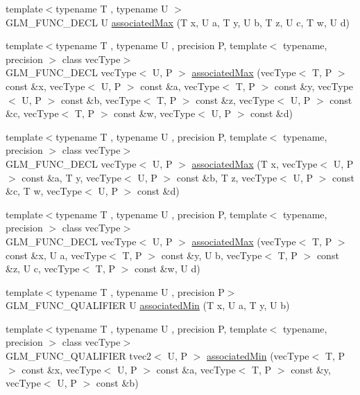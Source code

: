 \begin{DoxyCompactItemize}
\item 
{\footnotesize template$<$typename T , typename U $>$ }\\G\+L\+M\+\_\+\+F\+U\+N\+C\+\_\+\+D\+E\+C\+L U \hyperlink{group__gtx__associated__min__max_ga3038ffcb43eaa6af75897a99a5047ccc}{associated\+Max} (T x, U a, T y, U b, T z, U c, T w, U d)
\item 
{\footnotesize template$<$typename T , typename U , precision P, template$<$ typename, precision $>$ class vec\+Type$>$ }\\G\+L\+M\+\_\+\+F\+U\+N\+C\+\_\+\+D\+E\+C\+L vec\+Type$<$ U, P $>$ \hyperlink{group__gtx__associated__min__max_gaf607886421c35cd7e4f41a50d7c330e3}{associated\+Max} (vec\+Type$<$ T, P $>$ const \&x, vec\+Type$<$ U, P $>$ const \&a, vec\+Type$<$ T, P $>$ const \&y, vec\+Type$<$ U, P $>$ const \&b, vec\+Type$<$ T, P $>$ const \&z, vec\+Type$<$ U, P $>$ const \&c, vec\+Type$<$ T, P $>$ const \&w, vec\+Type$<$ U, P $>$ const \&d)
\item 
{\footnotesize template$<$typename T , typename U , precision P, template$<$ typename, precision $>$ class vec\+Type$>$ }\\G\+L\+M\+\_\+\+F\+U\+N\+C\+\_\+\+D\+E\+C\+L vec\+Type$<$ U, P $>$ \hyperlink{group__gtx__associated__min__max_ga7a165de1af9a3f9193516a3b47407086}{associated\+Max} (T x, vec\+Type$<$ U, P $>$ const \&a, T y, vec\+Type$<$ U, P $>$ const \&b, T z, vec\+Type$<$ U, P $>$ const \&c, T w, vec\+Type$<$ U, P $>$ const \&d)
\item 
{\footnotesize template$<$typename T , typename U , precision P, template$<$ typename, precision $>$ class vec\+Type$>$ }\\G\+L\+M\+\_\+\+F\+U\+N\+C\+\_\+\+D\+E\+C\+L vec\+Type$<$ U, P $>$ \hyperlink{group__gtx__associated__min__max_ga3122fbe8133ea54749b10fb93e8a167e}{associated\+Max} (vec\+Type$<$ T, P $>$ const \&x, U a, vec\+Type$<$ T, P $>$ const \&y, U b, vec\+Type$<$ T, P $>$ const \&z, U c, vec\+Type$<$ T, P $>$ const \&w, U d)
\item 
{\footnotesize template$<$typename T , typename U , precision P$>$ }\\G\+L\+M\+\_\+\+F\+U\+N\+C\+\_\+\+Q\+U\+A\+L\+I\+F\+I\+E\+R U \hyperlink{group__gtx__associated__min__max_gacc01bd272359572fc28437ae214a02df}{associated\+Min} (T x, U a, T y, U b)
\item 
{\footnotesize template$<$typename T , typename U , precision P, template$<$ typename, precision $>$ class vec\+Type$>$ }\\G\+L\+M\+\_\+\+F\+U\+N\+C\+\_\+\+Q\+U\+A\+L\+I\+F\+I\+E\+R tvec2$<$ U, P $>$ \hyperlink{group__gtx__associated__min__max_ga8b538d10872626668a078e2bd495af25}{associated\+Min} (vec\+Type$<$ T, P $>$ const \&x, vec\+Type$<$ U, P $>$ const \&a, vec\+Type$<$ T, P $>$ const \&y, vec\+Type$<$ U, P $>$ const \&b)

\end{DoxyCompactItemize}
